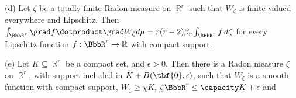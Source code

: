 (d) Let $\zeta$ be a totally finite Radon measure on $\BbbR^r$ such that
$W_{\zeta}$ is finite-valued everywhere and Lipschitz.   Then
$\int_{\BbbR^r}\varinnerprod{\grad f}{\grad W_{\zeta}}d\mu
=r(r-2)\beta_r\int_{\BbbR^r}f\,d\zeta$ for every Lipschitz function
$f:\BbbR^r\to\Bbb R$ with compact support.


(e) Let $K\subseteq\BbbR^r$ be a compact set, and $\epsilon>0$.   Then
there is a Radon measure $\zeta$ on $\BbbR^r$, with support included in
$K+B(\tbf{0},\epsilon)$, such that $W_{\zeta}$ is a smooth function with compact
support, $W_{\zeta}\ge\chi K$, $\zeta\BbbR^r\le\capacity K+\epsilon$ and


